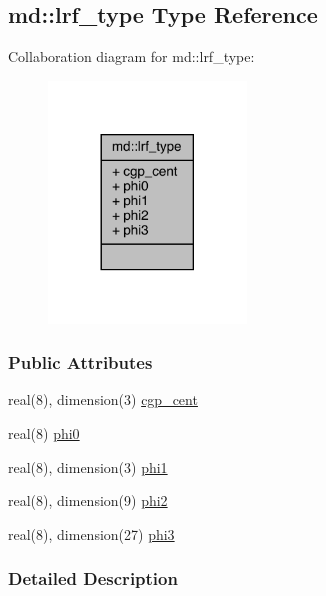 \hypertarget{structmd_1_1lrf__type}{\subsection{md\-:\-:lrf\-\_\-type Type Reference}
\label{structmd_1_1lrf__type}
}


Collaboration diagram for md\-:\-:lrf\-\_\-type\-:
\nopagebreak
\begin{figure}[H]
\begin{center}
\leavevmode
\includegraphics[width=149pt]{structmd_1_1lrf__type__coll__graph}
\end{center}
\end{figure}
\subsubsection*{Public Attributes}
\begin{DoxyCompactItemize}
\item 
real(8), dimension(3) \hyperlink{structmd_1_1lrf__type_ab136a9bf0c7aaedc4f227688b43ee96f}{cgp\-\_\-cent}
\item 
real(8) \hyperlink{structmd_1_1lrf__type_ab374aa816bf16b2cc35cd5c994cf91bb}{phi0}
\item 
real(8), dimension(3) \hyperlink{structmd_1_1lrf__type_a61e0a8229f18e076c41ac380e28c63e6}{phi1}
\item 
real(8), dimension(9) \hyperlink{structmd_1_1lrf__type_a8994cc776422b59856dddb5455a802a8}{phi2}
\item 
real(8), dimension(27) \hyperlink{structmd_1_1lrf__type_aa982d3294206bfd7d39eb544592b8eb6}{phi3}
\end{DoxyCompactItemize}


\subsubsection{Detailed Description}



